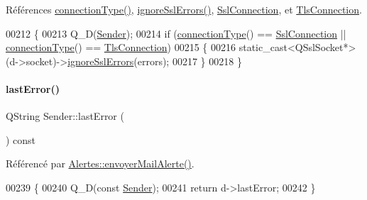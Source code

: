 Références \hyperlink{class_simple_mail_1_1_sender_a044468efe3bafa577a3039b997a4ae23}{connection\+Type()}, \hyperlink{class_simple_mail_1_1_sender_a198c2a1fef662cd2323d05c1f5fa6adb}{ignore\+Ssl\+Errors()}, \hyperlink{class_simple_mail_1_1_sender_a89e6a9572b306441237f6b6635729d1aadd47ac04a99ebb279aaa4cf5cdfa78f5}{Ssl\+Connection}, et \hyperlink{class_simple_mail_1_1_sender_a89e6a9572b306441237f6b6635729d1aa3461f2931e043fc3ea86a0015c735159}{Tls\+Connection}.


\begin{DoxyCode}
00212 \{
00213     Q\_D(\hyperlink{class_simple_mail_1_1_sender}{Sender});
00214     \textcolor{keywordflow}{if} (\hyperlink{class_simple_mail_1_1_sender_a044468efe3bafa577a3039b997a4ae23}{connectionType}() == \hyperlink{class_simple_mail_1_1_sender_a89e6a9572b306441237f6b6635729d1aadd47ac04a99ebb279aaa4cf5cdfa78f5}{SslConnection} || 
      \hyperlink{class_simple_mail_1_1_sender_a044468efe3bafa577a3039b997a4ae23}{connectionType}() == \hyperlink{class_simple_mail_1_1_sender_a89e6a9572b306441237f6b6635729d1aa3461f2931e043fc3ea86a0015c735159}{TlsConnection})
00215     \{
00216         \textcolor{keyword}{static\_cast<}QSslSocket*\textcolor{keyword}{>}(d->socket)->\hyperlink{class_simple_mail_1_1_sender_a198c2a1fef662cd2323d05c1f5fa6adb}{ignoreSslErrors}(errors);
00217     \}
00218 \}
\end{DoxyCode}
\mbox{\label{class_simple_mail_1_1_sender_a490af129ea3af3a17f36ffd508a56bc1}} 
\paragraph{\texorpdfstring{last\+Error()}{lastError()}}
{\footnotesize\ttfamily Q\+String Sender\+::last\+Error (\begin{DoxyParamCaption}{ }\end{DoxyParamCaption}) const}



Référencé par \hyperlink{class_alertes_a375783502a78109f3323dc1ed90cfdc9}{Alertes\+::envoyer\+Mail\+Alerte()}.


\begin{DoxyCode}
00239 \{
00240     Q\_D(\textcolor{keyword}{const} \hyperlink{class_simple_mail_1_1_sender}{Sender});
00241     \textcolor{keywordflow}{return} d->lastError;
00242 \}
\end{DoxyCode}
\mbox{\label{class_simple_mail_1_1_sender_ab329650eae52416579e4ed1bb90d49e4}} 
